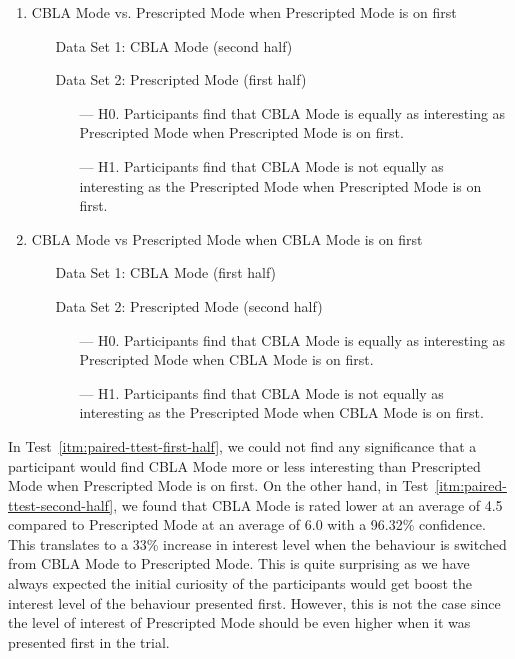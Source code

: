\begin{enumerate}[resume]
	\item CBLA Mode vs. Prescripted Mode when Prescripted Mode is on first
	\begin{itemize}[align=left]\label{itm:paired-ttest-first-half}
		\item[Data Set 1: ] CBLA Mode (second half)
		\item[Data Set 2: ] Prescripted Mode (first half)
		\begin{itemize}
			\item[--- H0.] Participants find that CBLA Mode is equally as interesting as Prescripted Mode when Prescripted Mode is on first.
			\item[--- H1.] Participants find that CBLA Mode is not equally as interesting as the Prescripted Mode when Prescripted Mode is on first.
		\end{itemize}
	\end{itemize}
	\item CBLA Mode vs Prescripted Mode when CBLA Mode is on first
	\begin{itemize}[align=left]\label{itm:paired-ttest-second-half}
		\item[Data Set 1: ]  CBLA Mode (first half) 
		\item[Data Set 2: ]  Prescripted Mode (second half) 
		\begin{itemize}
			\item[--- H0.] Participants find that CBLA Mode is equally as interesting as Prescripted Mode when CBLA Mode is on first.
			\item[--- H1.] Participants find that CBLA Mode is not equally as interesting as the Prescripted Mode when CBLA Mode is on first.
		\end{itemize}
	\end{itemize}
\end{enumerate}

In Test~\ref{itm:paired-ttest-first-half}, we could not find any significance that a participant would find CBLA Mode more or less interesting than Prescripted Mode when Prescripted Mode is on first. On the other hand, in Test~\ref{itm:paired-ttest-second-half}, we found that CBLA Mode is rated lower at an average of 4.5 compared to Prescripted Mode at an average of 6.0 with a 96.32\% confidence. This translates to a 33\% increase in interest level when the behaviour is switched from CBLA Mode to Prescripted Mode. This is quite surprising as we have always expected the initial curiosity of the participants would get boost the interest level of the behaviour presented first. However, this is not the case since the level of interest of Prescripted Mode should be even higher when it was presented first in the trial.


